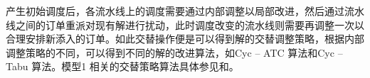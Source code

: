 产生初始调度后，各流水线上的调度需要通过内部调整以局部改进，然后通过流水线之间的订单重派对现有解进行扰动，此时调度改变的流水线则需要再调整一次以合理安排新添入的订单。如此交替操作便是可以得到解的交替调整策略，根据内部调整策略的不同，可以得到不同的解的改进算法，如Cyc -- ATC 算法和Cyc -- Tabu 算法。模型1 相关的交替策略算法具体参见和。

